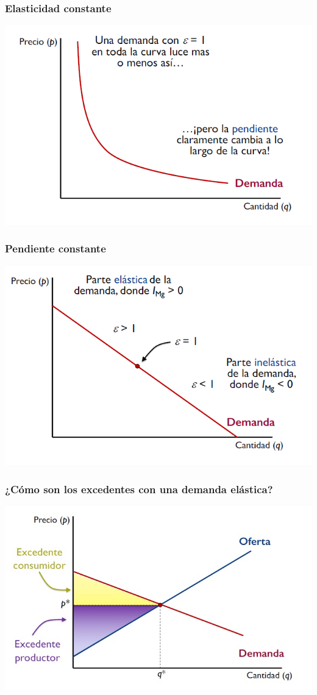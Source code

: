 \documentclass{beamer}
\begin{document}
\begin{frame}
\frametitle{Elasticidad constante}
\includegraphics[scale=0.6]{Slides Principios de Economia/Figures/Tema_06.45_elasticidad.png}
\end{frame}

\begin{frame}
\frametitle{Pendiente constante}
\includegraphics[scale=0.6]{Slides Principios de Economia/Figures/Tema_06.46_elasticidad2.png}
\end{frame}

\begin{frame}
\frametitle{¿Cómo son los excedentes con una demanda elástica?}
\includegraphics[scale=0.6]{Slides Principios de Economia/Figures/Tema_07.24_equilibrioyexcedente2.jpg}
\end{frame}
\end{document}
